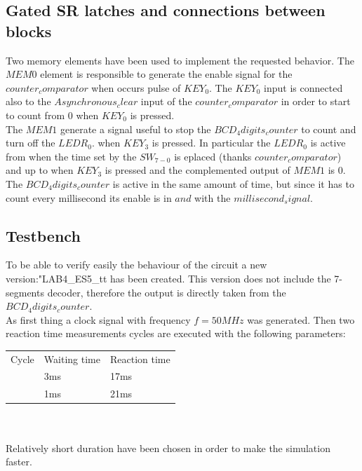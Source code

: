 \documentclass[12pt]{article}
\begin{document}
\subsection{Gated SR latches and connections between blocks}
Two memory elements have been used to implement the requested behavior. 
The $MEM0$ element is responsible to generate the enable signal for the $counter_comparator$ when occurs pulse of $KEY_0$. The $KEY_0$ input is connected also to the $Asynchronous_clear$ input of the $counter_comparator$ in order to start to count from $0$ when $KEY_0$ is pressed.
\\The $MEM1$ generate a signal useful to stop the $BCD_4digits_counter$ to count and turn off the $LEDR_0$. when $KEY_3$ is pressed. In particular the $LEDR_0$ is active from when the time set by the $SW_{7-0}$ is eplaced (thanks $counter_comparator$) and up to when $KEY_3$ is pressed and the complemented output of $MEM1$ is $0$. The $BCD_4digits_counter$ is active in the same amount of time, but since it has to count every millisecond its enable is in $and$ with the $millisecond_signal$.
\subsection{Testbench}
To be able to verify easily the behaviour of the circuit a new version:"LAB4\_ES5\_tt has been created. This version does not include the 7-segments decoder, therefore the output is directly taken from the $BCD_4digits_counter$. \\
As first thing a clock signal with frequency $f=50MHz$ was generated. 
Then two reaction time measurements cycles are executed with the following parameters:

	\begin{tabular}{lll}
		Cycle & Waiting time & Reaction time \\
		& 3ms          & 17ms          \\
		& 1ms          & 21ms         
	\end{tabular}
\\
\\
Relatively short duration have been chosen in order to make the simulation faster.
\end{document}
